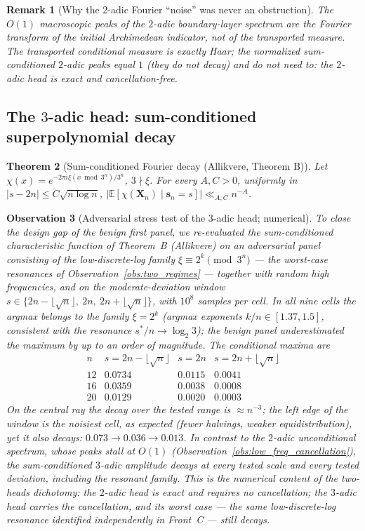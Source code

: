 \documentclass[12pt,a4paper]{article}
\newtheorem{theorem}{Theorem}[section]
\newtheorem{remark}[theorem]{Remark}
\newtheorem{observation}[theorem]{Observation}
\begin{document}
\begin{remark}[Why the $2$-adic Fourier ``noise'' was never an obstruction]
The $O(1)$ macroscopic peaks of the $2$-adic boundary-layer spectrum are the
Fourier transform of the \emph{initial Archimedean indicator}, not of the
transported measure. The transported conditional measure is exactly Haar; the
normalized sum-conditioned $2$-adic peaks equal $1$ (they do not decay) and
\emph{do not need to}: the $2$-adic head is exact and cancellation-free.
\end{remark}

\subsection{The $3$-adic head: sum-conditioned superpolynomial decay}

\begin{theorem}[Sum-conditioned Fourier decay (Allikvere, Theorem B)]
Let $\chi(x)=e^{-2\pi i\xi(x\bmod 3^n)/3^n}$, $3\nmid\xi$. For every $A,C>0$,
uniformly in $|s-2n|\le C\sqrt{n\log n}$,
$\big|\mathbb E[\chi(\mathbf X_n)\mid\mathbf s_n=s]\big|\ll_{A,C}n^{-A}$.
\end{theorem}

\begin{observation}[Adversarial stress test of the $3$-adic head; numerical]
\label{obs:stress_B}
To close the design gap of the benign first panel, we re-evaluated the
sum-conditioned characteristic function of Theorem~B (Allikvere) on an
adversarial panel consisting of the low-discrete-log family
$\xi\equiv 2^k\pmod{3^n}$ --- the worst-case resonances of
Observation~\ref{obs:two_regimes} --- together with random high frequencies,
and on the moderate-deviation window
$s\in\{2n-\lfloor\sqrt n\rfloor,\ 2n,\ 2n+\lfloor\sqrt n\rfloor\}$,
with $10^8$ samples per cell. In all nine cells the argmax belongs to the
family $\xi=2^k$ (argmax exponents $k/n\in[1.37,1.5]$, consistent with the
resonance $s^*/n\to\log_2 3$); the benign panel underestimated the maximum by
up to an order of magnitude. The conditional maxima are
\[
\begin{array}{c|ccc}
n & s=2n-\lfloor\sqrt n\rfloor & s=2n & s=2n+\lfloor\sqrt n\rfloor\\ \hline
12 & 0.0734 & 0.0115 & 0.0041\\
16 & 0.0359 & 0.0038 & 0.0008\\
20 & 0.0129 & 0.0020 & 0.0003
\end{array}
\]
On the central ray the decay over the tested range is $\approx n^{-3}$; the
left edge of the window is the noisiest cell, as expected (fewer halvings,
weaker equidistribution), yet it also decays: $0.073\to0.036\to0.013$.
In contrast to the $2$-adic unconditional spectrum, whose peaks stall at
$O(1)$ (Observation~\ref{obs:low_freq_cancellation}), the sum-conditioned
$3$-adic amplitude decays at every tested scale and every tested deviation,
including the resonant family. This is the numerical content of the two-heads
dichotomy: the $2$-adic head is exact and requires no cancellation; the
$3$-adic head carries the cancellation, and its worst case --- the same
low-discrete-log resonance identified independently in Front~C --- still
decays.
\end{observation}
\end{document}
